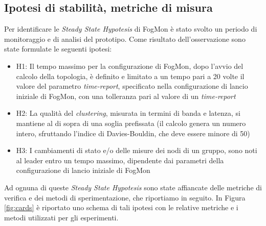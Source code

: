     \subsection{Ipotesi di stabilità, metriche di misura}
    Per identificare le \textit{Steady State Hypotesis} di FogMon è stato svolto un periodo di monitoraggio e di analisi del prototipo. Come risultato dell'osservazione sono state formulate le seguenti ipotesi:
    \begin{itemize}
        \item H1: Il tempo massimo per la configurazione di FogMon, dopo l'avvio del calcolo della topologia, è definito e limitato a un tempo pari a 20 volte il valore del parametro \textit{time-report}, specificato nella configurazione di lancio iniziale di FogMon, con una tolleranza pari al valore di un \textit{time-report}
        \item H2: La qualità del \textit{clustering}, misurata in termini di banda e latenza, si mantiene al di sopra di una soglia prefissata (il calcolo genera un numero intero, sfruttando l'indice di Davies-Bouldin, che deve essere minore di 50)
        \item H3: I cambiamenti di stato e/o delle misure dei nodi di un gruppo, sono noti al leader entro un tempo massimo, dipendente dai parametri della configurazione di lancio iniziale di FogMon
    \end{itemize}
    Ad ognuna di queste \textit{Steady State Hypotesis} sono state affiancate delle metriche di verifica e dei metodi di sperimentazione, che riportiamo in seguito. In Figura \ref{fig:cards} è riportato uno schema di tali ipotesi con le relative metriche e i metodi utilizzati per gli esperimenti.
    \newpage    
